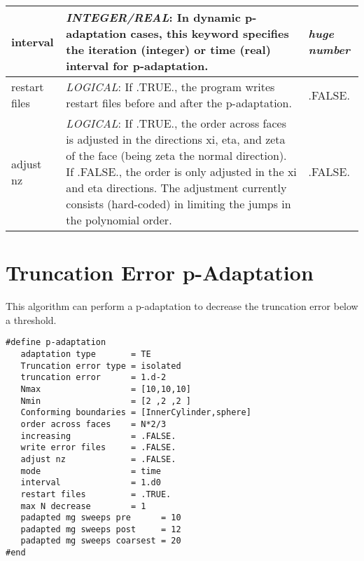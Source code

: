 \documentclass[a4paper,10pt]{report}
\begin{document}
\begin{longtable}{|p{4cm}|p{10cm}|p{2.2cm}|}
interval &
			\textit{INTEGER/REAL}: In dynamic p-adaptation cases, this keyword specifies the iteration (integer) or time (real) interval for p-adaptation. &
					\textit{huge number} \\ \hline

restart files &
			\textit{LOGICAL}: If .TRUE., the program writes restart files before and after the p-adaptation. &
					.FALSE. \\ \hline

adjust nz &
    \textit{LOGICAL}: If .TRUE., the order across faces is adjusted in the directions xi, eta, and zeta of the face (being zeta the normal direction). If .FALSE., the     order is only adjusted in the xi and eta directions. The adjustment currently consists (hard-coded) in limiting the jumps in the polynomial order. &
            .FALSE. \\ \hline
\end{longtable}

\section{Truncation Error p-Adaptation}
This algorithm can perform a p-adaptation to decrease the truncation error below a threshold.
\begin{lstlisting}
#define p-adaptation
   adaptation type       = TE
   Truncation error type = isolated
   truncation error      = 1.d-2
   Nmax                  = [10,10,10]
   Nmin                  = [2 ,2 ,2 ]
   Conforming boundaries = [InnerCylinder,sphere]
   order across faces    = N*2/3
   increasing            = .FALSE.
   write error files     = .FALSE.
   adjust nz             = .FALSE.
   mode                  = time
   interval              = 1.d0
   restart files         = .TRUE.
   max N decrease        = 1
   padapted mg sweeps pre      = 10
   padapted mg sweeps post     = 12
   padapted mg sweeps coarsest = 20
#end
\end{lstlisting}
\end{document}
